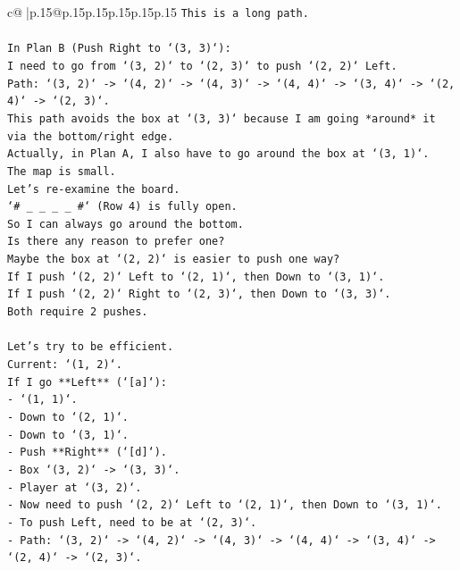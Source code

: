 \documentclass{article}
\begin{document}
{\begin{supertabular}{c@{$\;$}|p{.15\linewidth}@{}p{.15\linewidth}p{.15\linewidth}p{.15\linewidth}p{.15\linewidth}p{.15\linewidth}}
{{{\texttt{This is a long path.} \\
\\ 
\texttt{In Plan B (Push Right to `(3, 3)`):} \\
\texttt{I need to go from `(3, 2)` to `(2, 3)` to push `(2, 2)` Left.} \\
\texttt{Path: `(3, 2)` {-}> `(4, 2)` {-}> `(4, 3)` {-}> `(4, 4)` {-}> `(3, 4)` {-}> `(2, 4)` {-}> `(2, 3)`.} \\
\texttt{This path avoids the box at `(3, 3)` because I am going *around* it via the bottom/right edge.} \\
\texttt{Actually, in Plan A, I also have to go around the box at `(3, 1)`.} \\
\texttt{The map is small.} \\
\texttt{Let's re{-}examine the board.} \\
\texttt{`\# \_ \_ \_ \_ \#` (Row 4) is fully open.} \\
\texttt{So I can always go around the bottom.} \\
\texttt{Is there any reason to prefer one?} \\
\texttt{Maybe the box at `(2, 2)` is easier to push one way?} \\
\texttt{If I push `(2, 2)` Left to `(2, 1)`, then Down to `(3, 1)`.} \\
\texttt{If I push `(2, 2)` Right to `(2, 3)`, then Down to `(3, 3)`.} \\
\texttt{Both require 2 pushes.} \\
\\ 
\texttt{Let's try to be efficient.} \\
\texttt{Current: `(1, 2)`.} \\
\texttt{If I go **Left** (`{[}a{]}`):} \\
\texttt{{-} `(1, 1)`.} \\
\texttt{{-} Down to `(2, 1)`.} \\
\texttt{{-} Down to `(3, 1)`.} \\
\texttt{{-} Push **Right** (`{[}d{]}`).} \\
\texttt{{-} Box `(3, 2)` {-}> `(3, 3)`.} \\
\texttt{{-} Player at `(3, 2)`.} \\
\texttt{{-} Now need to push `(2, 2)` Left to `(2, 1)`, then Down to `(3, 1)`.} \\
\texttt{{-} To push Left, need to be at `(2, 3)`.} \\
\texttt{{-} Path: `(3, 2)` {-}> `(4, 2)` {-}> `(4, 3)` {-}> `(4, 4)` {-}> `(3, 4)` {-}> `(2, 4)` {-}> `(2, 3)`.} \\
}}}
\end{supertabular}}
\end{document}
